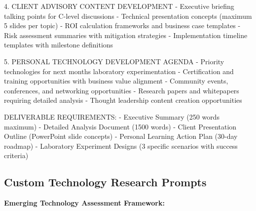 \documentclass[
  letterpaper,
  DIV=11,
  numbers=noendperiod]{scrartcl}
\newenvironment{Shaded}{\begin{snugshade}}{\end{snugshade}}
\newcommand{\NormalTok}[1]{\textcolor[rgb]{0.00,0.23,0.31}{#1}}
\begin{document}
\begin{Shaded}
\begin{Highlighting}[]
\NormalTok{4. CLIENT ADVISORY CONTENT DEVELOPMENT}
\NormalTok{   {-} Executive briefing talking points for C{-}level discussions}
\NormalTok{   {-} Technical presentation concepts (maximum 5 slides per topic)}
\NormalTok{   {-} ROI calculation frameworks and business case templates}
\NormalTok{   {-} Risk assessment summaries with mitigation strategies}
\NormalTok{   {-} Implementation timeline templates with milestone definitions}

\NormalTok{5. PERSONAL TECHNOLOGY DEVELOPMENT AGENDA}
\NormalTok{   {-} Priority technologies for next month\textquotesingle{}s laboratory experimentation}
\NormalTok{   {-} Certification and training opportunities with business value alignment}
\NormalTok{   {-} Community events, conferences, and networking opportunities}
\NormalTok{   {-} Research papers and whitepapers requiring detailed analysis}
\NormalTok{   {-} Thought leadership content creation opportunities}

\NormalTok{DELIVERABLE REQUIREMENTS:}
\NormalTok{{-} Executive Summary (250 words maximum)}
\NormalTok{{-} Detailed Analysis Document (1500 words)}
\NormalTok{{-} Client Presentation Outline (PowerPoint slide concepts)}
\NormalTok{{-} Personal Learning Action Plan (30{-}day roadmap)}
\NormalTok{{-} Laboratory Experiment Designs (3 specific scenarios with success criteria)}
\end{Highlighting}
\end{Shaded}

\subsection{Custom Technology Research
Prompts}\label{custom-technology-research-prompts}

\textbf{Emerging Technology Assessment Framework:}
\end{document}
